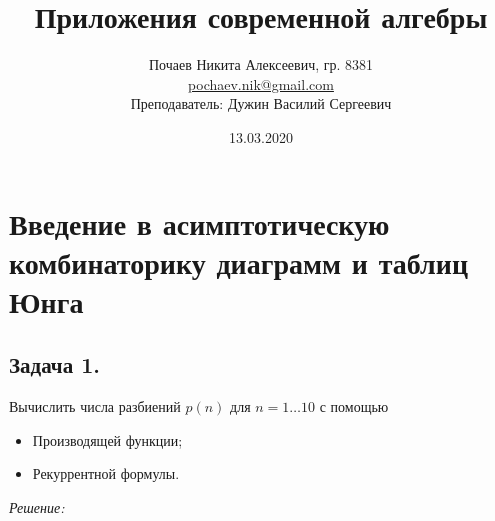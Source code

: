

\DeclareMathOperator{\eq}{\Leftrightarrow}

\title{Приложения современной алгебры}
\date{13.03.2020}
\author{Почаев Никита Алексеевич, гр. 8381 \\ \href{mailto:pochaev.nik@gmail.com}{pochaev.nik@gmail.com} \\ Преподаватель: Дужин Василий Сергеевич}


	
\renewcommand{\figurename}{Рисунок}

\maketitle

\section{Введение в асимптотическую комбинаторику диаграмм и таблиц Юнга}

\subsection*{Задача 1.}

Вычислить числа разбиений $p(n)$ для $n = 1 \dots 10$ с помощью
\begin{itemize}
	\item Производящей функции;
	\item Рекуррентной формулы.
\end{itemize}

\noindent\textit{Решение:}

